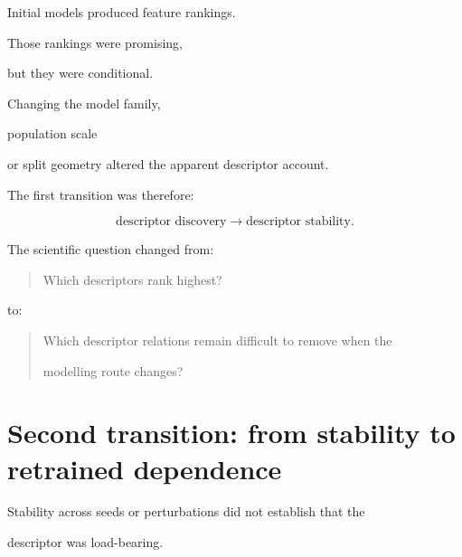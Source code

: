 \documentclass[11pt,a4paper,oneside]{report}
\begin{document}
Initial models produced feature rankings.



Those rankings were promising,

but they were conditional.



Changing the model family,

population scale

or split geometry altered the apparent descriptor account.



The first transition was therefore:



\begin{equation}
\text{descriptor discovery}
\rightarrow
\text{descriptor stability}.
\end{equation}



The scientific question changed from:



\begin{quote}



Which descriptors rank highest?



\end{quote}



to:



\begin{quote}



Which descriptor relations remain difficult to remove when the

modelling route changes?



\end{quote}





\section{Second transition: from stability to retrained dependence}



Stability across seeds or perturbations did not establish that the

descriptor was load-bearing.
\end{document}
